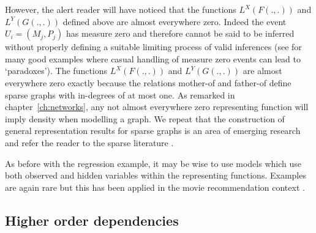 However, the alert reader will have noticed that the functions $L^X(F(.,.))$ and $L^Y(G(.,.))$ defined above are almost everywhere zero.
Indeed the event $U_i = (M_j, P_j)$ has measure zero and therefore cannot be said to be inferred without properly defining a suitable limiting process of valid inferences (see \eg \citet{Jaynes2003-jh} for many good examples where casual handling of measure zero events can lead to `paradoxes').
The functions $L^X(F(.,.))$ and $L^Y(G(.,.))$ are almost everywhere zero exactly because the relations mother-of and father-of define sparse graphs with in-degrees of at most one.
As remarked in chapter~\ref{ch:networks}, any not almost everywhere zero representing function will imply density when modelling a graph.
We repeat that the construction of general representation results for sparse graphs is an area of emerging research and refer the reader to the sparse literature \citep{Lovasz2012-df, Wolfe2013-vs, Caron2014-on}.

As before with the regression example, it may be wise to use models which use both observed and hidden variables within the representing functions.
Examples are again rare but this has been applied in \eg the movie recommendation context \citep[e.g.][]{Menon2011-ku}.

\subsection{Higher order dependencies}

